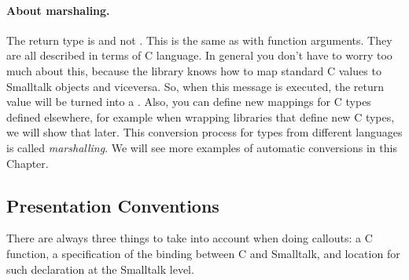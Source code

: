 \documentclass[a4paper,10pt,twoside]{book}
\begin{document}
\paragraph{About marshaling.} The return type is  and not . This is the same as with function arguments. They are all described in terms of C language. In general you don't have to worry too much about this, because the \Spock library knows how to map standard C values to Smalltalk objects and viceversa. So, when this message is executed, the return value will be turned into a . Also, you can define new mappings for C types defined elsewhere, for example when wrapping libraries that define new C types, we will show that later. This conversion process for types from different languages is called \emph{marshalling}. We will see more examples of automatic conversions in this Chapter. 

\subsection{Presentation Conventions}

There are always three things to take into account when doing callouts:  a C function, a specification of the binding between C and Smalltalk, and location for such declaration at the Smalltalk level. 
\end{document}
